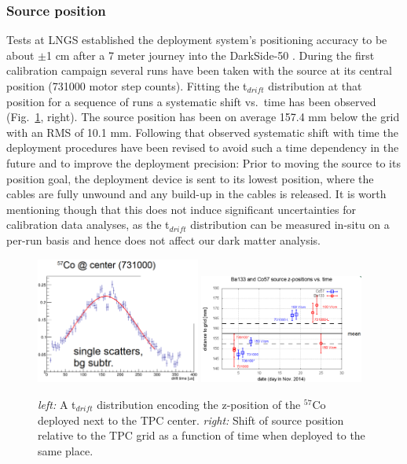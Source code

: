 \subsubsection{Source position}
Tests at LNGS established the deployment system's positioning accuracy to be about $\pm$1 cm after a 7 meter journey into the DarkSide-50 \lsv.
During the first calibration campaign several runs have been taken with the source at its central position (731000 motor step counts). Fitting the t$_{drift}$ distribution at that position for a sequence of runs a systematic shift vs.~time has been observed (Fig.~\ref{fig:SourcePosition}, right). The source position has been on average 157.4 mm below the grid with an RMS of 10.1 mm. Following that observed systematic shift with time the deployment procedures have been revised to avoid such a time dependency in the future and to improve the deployment precision: Prior to moving the source to its position goal, the deployment device is sent to its lowest position, where the cables are fully unwound and any build-up in the cables is released. It is worth mentioning though that this does not induce significant uncertainties for calibration data analyses, as the t$_{drift}$ distribution can be measured in-situ on a per-run basis and hence does not affect our dark matter analysis.
\begin{figure}[htbp]
\centering
\includegraphics[width=0.48\textwidth]{./Figures/Tdrift_distribution_Co57_DocDB1288.png}
\includegraphics[width=0.48\textwidth]{./Figures/SourcePosition_vs_time_DocDB1288.png}
\caption{\textit{left:} A t$_{drift}$ distribution encoding the z-position of the $^{57}$Co deployed next to the TPC center.
\textit{right:} Shift of source position relative to the TPC grid as a function of time when deployed to the same place.
\label{fig:SourcePosition}} 
\end{figure}

